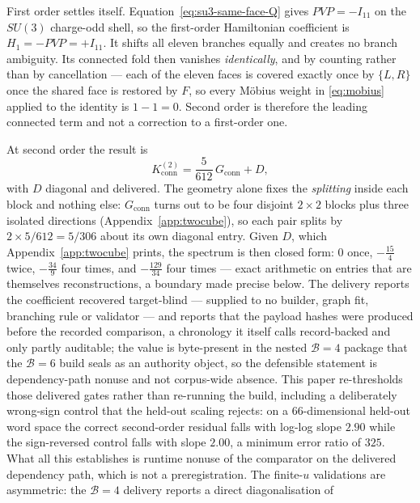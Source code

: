 \documentclass[11pt]{article}
\theoremstyle{plain}
\theoremstyle{definition}
\theoremstyle{remark}
\newcommand{\chk}[1]{}
\begin{document}
First order settles itself. Equation~\eqref{eq:su3-same-face-Q} gives
$PVP=-I_{11}$ on the $SU(3)$ charge-odd shell, so the first-order Hamiltonian
coefficient is $H_1=-PVP=+I_{11}$. It shifts all eleven branches equally and
creates no branch ambiguity. Its connected fold then vanishes
\emph{identically}, and by
counting rather than by cancellation --- each of the eleven faces is covered
exactly once by $\{L,R\}$ once the shared face is restored by $F$, so every
M\"obius weight in \eqref{eq:mobius} applied to the identity is $1-1=0$.
Second order is therefore the leading connected term and not a correction to a
first-order one.
\chk{connected first order vanishes by inclusion-exclusion, not by cancellation of numbers}

At second order the result is
\begin{equation}\label{eq:kconn}
  K^{(2)}_{\mathrm{conn}}=\frac{5}{612}\,G_{\mathrm{conn}}+D ,
\end{equation}
with $D$ diagonal and delivered. The geometry alone fixes the \emph{splitting}
inside each block and nothing else: $G_{\mathrm{conn}}$ turns out to be four
disjoint $2\times2$ blocks plus three isolated directions
(Appendix~\ref{app:twocube}), so each pair splits by $2\times5/612=5/306$ about
its own diagonal entry. Given $D$, which Appendix~\ref{app:twocube} prints,
  the spectrum is then closed form: $0$ once, $-\tfrac{15}4$ twice,
  $-\tfrac{34}9$ four times, and $-\tfrac{129}{34}$ four times ---
exact arithmetic on entries that are themselves reconstructions, a boundary
made precise below.
The delivery reports the coefficient recovered target-blind --- supplied to no
builder, graph fit, branching rule or validator --- and reports that the payload
hashes were produced before the recorded comparison, a chronology it itself
calls record-backed and only partly auditable; the value is byte-present in the
nested $\mathcal B=4$ package that the $\mathcal B=6$ build seals as an authority object, so the
defensible statement is dependency-path nonuse and not corpus-wide absence.
This paper re-thresholds those delivered gates rather
than re-running the build, including a deliberately wrong-sign control that the
held-out scaling rejects: on a $66$-dimensional held-out word space the correct
second-order residual falls with log-log slope $2.90$ while the sign-reversed
control falls with slope $2.00$, a minimum error ratio of $325$. What all this
establishes is runtime nonuse of the comparator on the delivered dependency
path, which is not a preregistration. The finite-$u$ validations are
asymmetric: the $\mathcal B=4$ delivery reports a direct diagonalisation of
\end{document}
